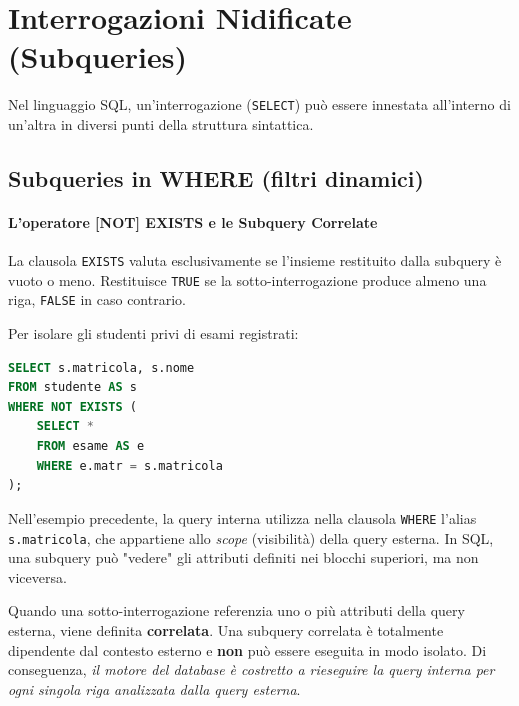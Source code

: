 \section{Interrogazioni Nidificate (Subqueries)}

Nel linguaggio SQL, un'interrogazione (\texttt{SELECT}) può essere innestata all'interno di un'altra in diversi punti della struttura sintattica.

\subsection{Subqueries in WHERE (filtri dinamici)}

\paragraph{L'operatore [NOT] EXISTS e le Subquery Correlate}

La clausola \texttt{EXISTS} valuta esclusivamente se l'insieme restituito dalla subquery è vuoto o meno. Restituisce \texttt{TRUE} se la sotto-interrogazione produce almeno una riga, \texttt{FALSE} in caso contrario.

\begin{example}
Per isolare gli studenti privi di esami registrati:
\begin{lstlisting}[language=SQL, basicstyle=\ttfamily\small, keywordstyle=\color{blue}\bfseries]
SELECT s.matricola, s.nome
FROM studente AS s
WHERE NOT EXISTS (
    SELECT *
    FROM esame AS e
    WHERE e.matr = s.matricola
);
\end{lstlisting}
\end{example}

\begin{observation}
Nell'esempio precedente, la query interna utilizza nella clausola \texttt{WHERE} l'alias \texttt{s.matricola}, che appartiene allo \textit{scope} (visibilità) della query esterna. In SQL, una subquery può "vedere" gli attributi definiti nei blocchi superiori, ma non viceversa.

Quando una sotto-interrogazione referenzia uno o più attributi della query esterna, viene definita \textbf{correlata}. Una subquery correlata è totalmente dipendente dal contesto esterno e \textbf{non} può essere eseguita in modo isolato. Di conseguenza, \textit{il motore del database è costretto a rieseguire la query interna per ogni singola riga analizzata dalla query esterna}.
\end{observation}


